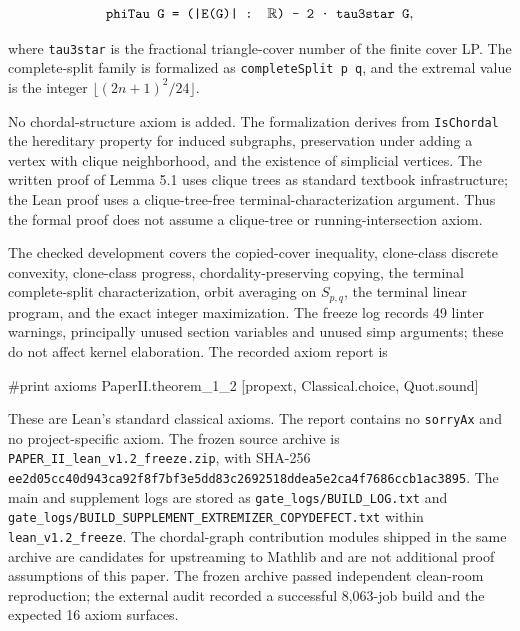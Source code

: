 \documentclass[
  american,
  11pt,
  a4paper,
]{article}
\newenvironment{Shaded}{}{}
\newcommand{\NormalTok}[1]{#1}
\begin{document}
\[
\texttt{phiTau G = (|E(G)| : \ensuremath{\mathbb{R}}) - 2 · tau3star G},
\]

where \texttt{tau3star} is the fractional triangle-cover number of the finite cover LP. The complete-split family is formalized as \texttt{completeSplit\ p\ q}, and the extremal value is the integer \(\lfloor(2n+1)^2/24\rfloor\).

No chordal-structure axiom is added. The formalization derives from \texttt{IsChordal} the hereditary property for induced subgraphs, preservation under adding a vertex with clique neighborhood, and the existence of simplicial vertices. The written proof of Lemma 5.1 uses clique trees as standard textbook infrastructure; the Lean proof uses a clique-tree-free terminal-characterization argument. Thus the formal proof does not assume a clique-tree or running-intersection axiom.

The checked development covers the copied-cover inequality, clone-class discrete convexity, clone-class progress, chordality-preserving copying, the terminal complete-split characterization, orbit averaging on \(S_{p,q}\), the terminal linear program, and the exact integer maximization. The freeze log records 49 linter warnings, principally unused section variables and unused simp arguments; these do not affect kernel elaboration. The recorded axiom report is

\begin{Shaded}
\begin{Highlighting}[]
\NormalTok{\#print axioms PaperII.theorem\_1\_2}
\NormalTok{[propext, Classical.choice, Quot.sound]}
\end{Highlighting}
\end{Shaded}

These are Lean's standard classical axioms. The report contains no \texttt{sorryAx} and no project-specific axiom. The frozen source archive is \texttt{PAPER\_II\_lean\_v1.2\_freeze.zip}, with SHA-256 \texttt{ee2d05cc40d943ca92f8f7bf3e5dd83c2692518ddea5e2ca4f7686ccb1ac3895}. The main and supplement logs are stored as \texttt{gate\_logs/BUILD\_LOG.txt} and \texttt{gate\_logs/BUILD\_SUPPLEMENT\_EXTREMIZER\_COPYDEFECT.txt} within \texttt{lean\_v1.2\_freeze}. The chordal-graph contribution modules shipped in the same archive are candidates for upstreaming to Mathlib and are not additional proof assumptions of this paper. The frozen archive passed independent clean-room reproduction; the external audit recorded a successful 8,063-job build and the expected 16 axiom surfaces.
\end{document}
